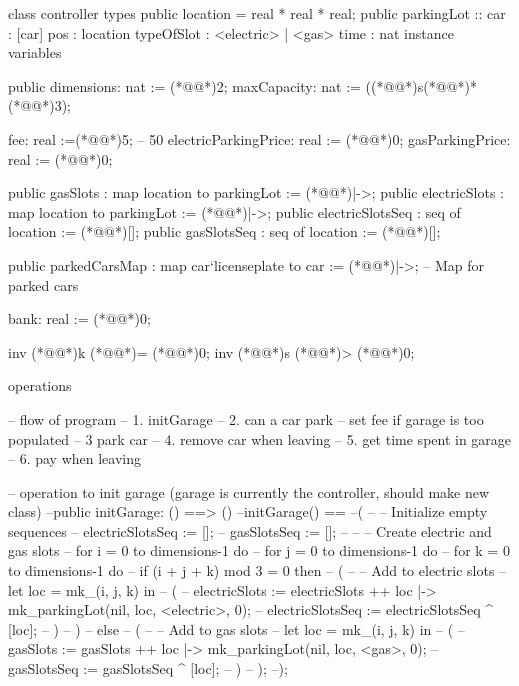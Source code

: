 \documentclass[a4paper]{article}
\begin{document}
\title{}
\author{}
\begin{vdm_al}
class controller
types
public location = real * real * real;
public parkingLot ::
        car : [car]
        pos : location
        typeOfSlot : <electric> | <gas>
        time : nat
instance variables
   
    public dimensions: nat := (*@\vdmnotcovered{}@*)2;
    maxCapacity: nat := ((*@@*)s(*@\vdmnotcovered{*}@*)*(*@\vdmnotcovered{}@*)3);

    fee: real :=(*@@*)5; --  50%
    electricParkingPrice: real := (*@@*)0;
    gasParkingPrice: real := (*@@*)0;

    
    public gasSlots : map location to parkingLot := (*@\vdmnotcovered{}@*){|->};
    public electricSlots : map location to parkingLot := (*@\vdmnotcovered{}@*){|->};
    public electricSlotsSeq : seq of location := (*@\vdmnotcovered{}@*)[];
    public gasSlotsSeq : seq of location := (*@\vdmnotcovered{}@*)[];

    public parkedCarsMap : map car`licenseplate to car := (*@\vdmnotcovered{}@*){|->};  -- Map for parked cars


    bank: real := (*@@*)0;

inv (*@@*)k (*@\vdmnotcovered{>}@*)= (*@@*)0;
inv (*@@*)s (*@\vdmnotcovered{}@*)> (*@\vdmnotcovered{}@*)0;

operations

-- flow of program
-- 1. initGarage
-- 2. can a car park
-- set fee if garage is too populated
-- 3  park car
-- 4. remove car when leaving
-- 5. get time spent in garage
-- 6. pay when leaving

-- operation to init garage (garage is currently the controller, should make new class)
--public initGarage: () ==> ()
--initGarage() ==
--(
--    -- Initialize empty sequences
--    electricSlotsSeq := [];
--    gasSlotsSeq := [];
--
--    -- Create electric and gas slots
--    for i = 0 to dimensions-1 do
--        for j = 0 to dimensions-1 do
--            for k = 0 to dimensions-1 do
--                if (i + j + k) mod 3 = 0 then
--                (
--                    -- Add to electric slots
--                    let loc = mk_(i, j, k) in
--                    (
--                        electricSlots := electricSlots ++ {loc |-> mk_parkingLot(nil, loc, <electric>, 0)};
--                        electricSlotsSeq := electricSlotsSeq ^ [loc];
--                    )
--                )
--                else
--                (
--                    -- Add to gas slots
--                    let loc = mk_(i, j, k) in
--                    (
--                        gasSlots := gasSlots ++ {loc |-> mk_parkingLot(nil, loc, <gas>, 0)};
--                        gasSlotsSeq := gasSlotsSeq ^ [loc];
--                    )
--                );
--);




\end{vdm_al}
\end{document}
